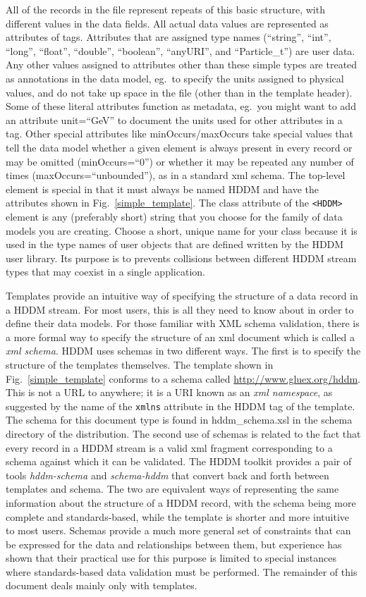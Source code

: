 \documentclass{revtex4}
\begin{document}
All of the records in the file represent repeats of this basic structure, with 
different values in the data fields. All actual data values are represented as
attributes of tags. Attributes that are assigned type names (``string'', ``int'',
``long'', ``float'', ``double'', ``boolean'', ``anyURI'', and ``Particle\_t'')
are user data. Any other values assigned to attributes other than these simple
types are treated as annotations in the data model, eg.\ to specify the units
assigned to physical values, and do not take up space in the file (other than
in the template header). Some of these literal attributes function as metadata,
eg.\ you might want to add an attribute unit=``GeV'' to document the units used
for other attributes in a tag. Other special attributes like minOccurs/maxOccurs
take special values that tell the data model whether a given element is always
present in every record or may be omitted (minOccurs=``0'') or whether it may
be repeated any number of times (maxOccurs=``unbounded''), as in a standard
xml schema. The top-{}level element is special in that it must always be named
HDDM and have the attributes shown in Fig.~\ref{simple_template}. The class
attribute of the \texttt{<HDDM>} element is any (preferably short) string that
you choose for the family of data models you are creating. Choose a short, unique
name for your class because it is used in the type names of user objects that are
defined written by the HDDM user library. Its purpose is to prevents collisions
between different HDDM stream types that may coexist in a single application.

Templates provide an intuitive way of specifying the structure of a data record
in a HDDM stream. For most users, this is all they need to know about in order
to define their data models. For those familiar with XML schema validation,
there is a more formal way to specify the structure of an xml document which is
called a {\em xml schema}. HDDM uses schemas in two different ways. The first
is to specify the structure of the templates themselves. The template shown in
Fig.~\ref{simple_template} conforms to a schema called \url{http://www.gluex.org/hddm}.
This is not a URL to anywhere; it is a URI known as an {\em xml namespace}, as
suggested by the name of the \texttt{xmlns} attribute in the HDDM tag of the template.
The schema for this document type is found in hddm\_schema.xsl in the schema
directory of the distribution. The second use of schemas is related to the fact
that every record in a HDDM stream is a valid xml fragment corresponding to a
schema against which it can be validated. The HDDM toolkit provides a pair of
tools {\em hddm-{}schema} and {\em schema-{}hddm} that convert back and forth
between templates and schema. The two are equivalent ways of representing the
same information about the structure of a HDDM record, with the schema being
more complete and standards-{}based, while the template is shorter and more 
intuitive to most users. Schemas provide a much more general set of constraints
that can be expressed for the data and relationships between them, but 
experience has shown that their practical use for this purpose is limited to
special instances where standards-based data validation must be performed.
The remainder of this document deals mainly only with templates.
\end{document}
